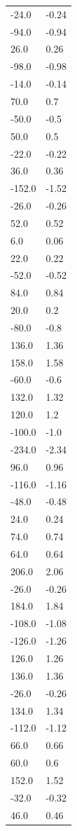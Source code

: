 \begin{longtable}{ll}
-24.0 & -0.24 \\
-94.0 & -0.94 \\
26.0 & 0.26 \\
-98.0 & -0.98 \\
-14.0 & -0.14 \\
70.0 & 0.7 \\
-50.0 & -0.5 \\
50.0 & 0.5 \\
-22.0 & -0.22 \\
36.0 & 0.36 \\
-152.0 & -1.52 \\
-26.0 & -0.26 \\
52.0 & 0.52 \\
6.0 & 0.06 \\
22.0 & 0.22 \\
-52.0 & -0.52 \\
84.0 & 0.84 \\
20.0 & 0.2 \\
-80.0 & -0.8 \\
136.0 & 1.36 \\
158.0 & 1.58 \\
-60.0 & -0.6 \\
132.0 & 1.32 \\
120.0 & 1.2 \\
-100.0 & -1.0 \\
-234.0 & -2.34 \\
96.0 & 0.96 \\
-116.0 & -1.16 \\
-48.0 & -0.48 \\
24.0 & 0.24 \\
74.0 & 0.74 \\
64.0 & 0.64 \\
206.0 & 2.06 \\
-26.0 & -0.26 \\
184.0 & 1.84 \\
-108.0 & -1.08 \\
-126.0 & -1.26 \\
126.0 & 1.26 \\
136.0 & 1.36 \\
-26.0 & -0.26 \\
134.0 & 1.34 \\
-112.0 & -1.12 \\
66.0 & 0.66 \\
60.0 & 0.6 \\
152.0 & 1.52 \\
-32.0 & -0.32 \\
46.0 & 0.46 \\

\end{longtable}
